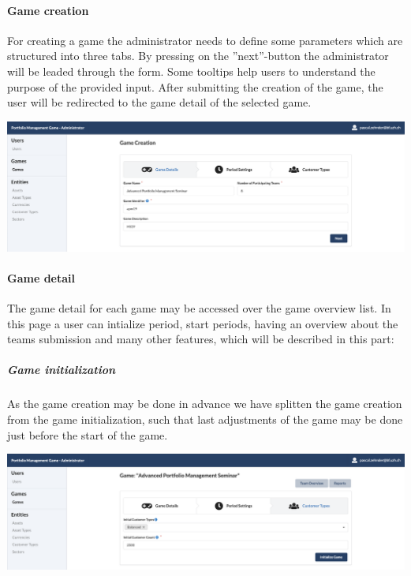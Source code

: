 \paragraph{Game creation}
For creating a game the administrator needs to define some parameters which are structured into three tabs. By pressing on the ''next''-button the administrator will be leaded through the form. Some tooltips help users to understand the purpose of the provided input. After submitting the creation of the game, the user will be redirected to the game detail of the selected game.
\begin{center}
  \includegraphics[scale=0.2]{img/application-overview/administrator/03_game_creation.png}
\end{center}

\paragraph{Game detail}
The game detail for each game may be accessed over the game overview list. In this page a user can intialize period, start periods, having an overview about the teams submission and many other features, which will be described in this part:

\subparagraph{Game initialization}
As the game creation may be done in advance we have splitten the game creation from the game initialization, such that last adjustments of the game may be done just before the start of the game.
\begin{center}
  \includegraphics[scale=0.2]{img/application-overview/administrator/04_game_initialization.png}
\end{center}

